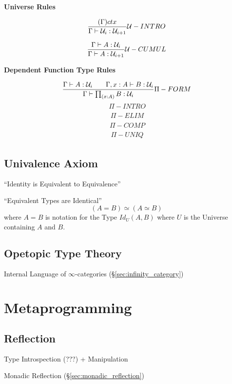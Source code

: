 \textbf{Universe Rules}

\[
  {
    \frac
    {(\Gamma) ctx}
    {\Gamma \vdash \mathcal{U}_i : \mathcal{U}_{i+1}}
  } \mathcal{U}-INTRO
\]

\[
  {
    \frac
    {\Gamma \vdash A : \mathcal{U}_i}
    {\Gamma \vdash A : \mathcal{U}_{i+1}}
  } \mathcal{U}-CUMUL
\]



\textbf{Dependent Function Type Rules}

\[
  {
    \frac
    {\Gamma \vdash A : \mathcal{U}_i \;\;\;\;\;\;\;
    \Gamma,x:A \vdash B : \mathcal{U}_i}
    {\Gamma \vdash \prod_{(x:A)} B : \mathcal{U}_i}
  } \Pi-FORM
\]\[
  {
    \frac
    {}
    {}
  } \Pi-INTRO
\]\[
  {
    \frac
    {}
    {}
  } \Pi-ELIM
\]\[
  {
    \frac
    {}
    {}
  } \Pi-COMP
\]\[
  {
    \frac
    {}
    {}
  } \Pi-UNIQ
\]



\subsection{Univalence Axiom}\label{sec:univalence_axiom}

``Identity is Equivalent to Equivalence''

``Equivalent Types are Identical''
\[
  (A = B) \simeq (A \simeq B)
\]
where $A = B$ is notation for the Type $Id_U(A,B)$ where $U$ is the
Universe containing $A$ and $B$.



\subsection{Opetopic Type Theory}\label{sec:opetopic_typetheory}

Internal Language of $\infty$-categories
(\S\ref{sec:infinity_category})



\section{Metaprogramming}\label{sec:metaprogramming}

\subsection{Reflection}\label{sec:type_reflection}

Type Introspection (???) + Manipulation

Monadic Reflection (\S\ref{sec:monadic_reflection})
